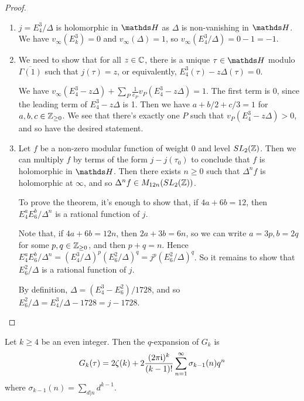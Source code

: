 \documentclass[10pt,a4paper]{article}
\begin{document}
\begin{proof}\hspace*{0cm}
  \begin{enumerate}
    \item $j = E_4^3/\Delta$ is holomorphic in $\H$ as $\Delta$ is non-vanishing in $\H$. We have $v_\infty(E_k^3) = 0$ and $v_\infty(\Delta) = 1$, so $v_\infty(E_4^3/\Delta) = 0-1 = -1$.
    \item We need to show that for all $z \in \mathbb{C}$, there is a unique $\tau \in \H$ modulo $\overline{\Gamma(1)}$ such that $j(\tau) = z$, or equivalently, $E_4^3(\tau) - z\Delta(\tau) = 0$.

    We have $v_{\infty}(E_4^3-z\Delta) + \sum_P \frac{1}{e_P}v_P(E_4^3-z\Delta) = 1$. The first term is $0$, since the leading term of $E_4^3-z\Delta$ is 1. Then we have $a+ b/2 + c/3 = 1$ for $a,b,c \in \mathbb{Z}_{\geq 0}$. We see that there's exactly one $P$ such that $v_P(E_4^3-z\Delta) > 0$, and so have the desired statement.
    \item Let $f$ be a non-zero modular function of weight 0 and level $SL_2(\mathbb{Z})$. Then we can multiply $f$ by terms of the form $j-j(\tau_0)$ to conclude that $f$ is holomorphic in $\H$. Then there exists $n \geq 0$ such that $\Delta^n f$ is holomorphic at $\infty$, and so $\Delta^n f \in M_{12n}(SL_2(\mathbb{Z}))$.

    To prove the theorem, it's enough to show that, if $4a+6b = 12$, then $E_4^aE_6^b/\Delta^n$ is a rational function of $j$.

    Note that, if $4a+6b = 12n$, then $2a+3b=6n$, so we can write $a = 3p, b = 2q$ for some $p, q \in \mathbb{Z}_{\geq 0}$, and then $p+q = n$. Hence $E_4^aE_6^b/\Delta^n = (E_4^3/\Delta)^p (E_6^2/\Delta)^q = j^p (E_6^2/\Delta)^q$. So it remains to show that $E_6^2/\Delta$ is a rational function of $j$.

    By definition, $\Delta = (E_4^3 - E_6^2)/1728$, and so $E_6^2/\Delta = E_4^3/\Delta - 1728 = j - 1728$.
  \end{enumerate}
\end{proof}
\begin{proposition}
  Let $k \geq 4$ be an even integer. Then the $q$-expansion of $G_k$ is
  \[G_k(\tau) = 2\zeta(k) + 2 \frac{(2\pi\mathfrak{i})^k}{(k-1)!}\sum_{n=1}^\infty \sigma_{k-1}(n)q^n\]
  where $\sigma_{k-1}(n)= \sum_{d|n}d^{k-1}$.
\end{proposition}
\end{document}
